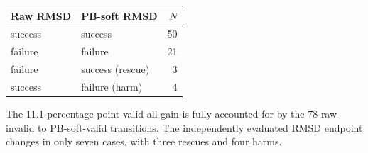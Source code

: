 \begin{table}[!ht]
\begin{minipage}[t]{0.49\textwidth}
\vspace{2pt}
\begin{tabular}{llr}
\toprule
Raw RMSD & PB-soft RMSD & $N$\\
\midrule
success & success & 50\\
failure & failure & 21\\
failure & success (rescue) & 3\\
success & failure (harm) & 4\\
\bottomrule
\end{tabular}
\end{minipage}

\vspace{3pt}
\raggedright\footnotesize
The 11.1-percentage-point valid-all gain is fully accounted for by the 78 raw-invalid to PB-soft-valid transitions. The independently evaluated RMSD endpoint changes in only seven cases, with three rescues and four harms.
\end{table}

